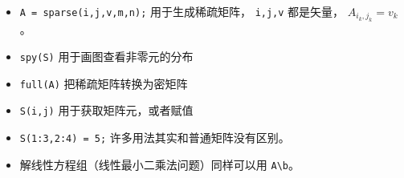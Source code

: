 
\begin{issues}
\issueDraft
\end{issues}

\begin{itemize}
\item \verb|A = sparse(i,j,v,m,n);| 用于生成稀疏矩阵， \verb|i,j,v| 都是矢量， $A_{i_k,j_k} = v_k$。
\item \verb|spy(S)| 用于画图查看非零元的分布
\item \verb|full(A)| 把稀疏矩阵转换为密矩阵
\item \verb|S(i,j)| 用于获取矩阵元，或者赋值
\item \verb|S(1:3,2:4) = 5;| 许多用法其实和普通矩阵没有区别。
\item 解线性方程组（线性最小二乘法问题）同样可以用 \verb|A\b|。
\end{itemize}
